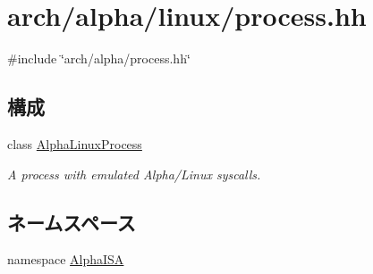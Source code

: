 \hypertarget{arch_2alpha_2linux_2process_8hh}{
\section{arch/alpha/linux/process.hh}
\label{arch_2alpha_2linux_2process_8hh}
}
{\ttfamily \#include \char`\"{}arch/alpha/process.hh\char`\"{}}\par
\subsection*{構成}
\begin{DoxyCompactItemize}
\item 
class \hyperlink{classAlphaISA_1_1AlphaLinuxProcess}{AlphaLinuxProcess}
\begin{DoxyCompactList}\small\item\em A process with emulated Alpha/Linux syscalls. \item\end{DoxyCompactList}\end{DoxyCompactItemize}
\subsection*{ネームスペース}
\begin{DoxyCompactItemize}
\item 
namespace \hyperlink{namespaceAlphaISA}{AlphaISA}
\end{DoxyCompactItemize}
